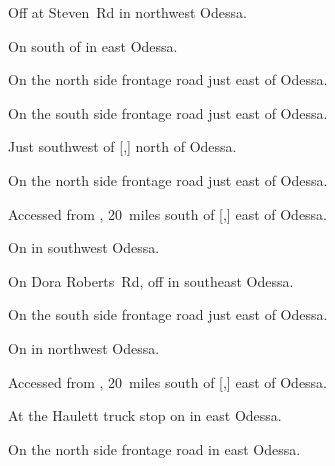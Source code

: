 

\begin{LocationList}

Off  at Steven~Rd in northwest Odessa.

On  south of  in east Odessa.

\Location{\GarageHQ \Garage}
On the north side  frontage road just east of Odessa.

On the south side  frontage road just east of Odessa.

Just southwest of [,] north of Odessa.

On the north side  frontage road just east of Odessa.

Accessed from , 20~miles south of [,] east of Odessa.

On  in southwest Odessa.

On  Dora Roberts~Rd, off  in southeast Odessa.

On the south side  frontage road just east of Odessa.

On  in northwest Odessa.

Accessed from , 20~miles south of [,] east of Odessa.

At the Haulett truck stop on  in east Odessa.

On the north side  frontage road in east Odessa.

\end{LocationList}

